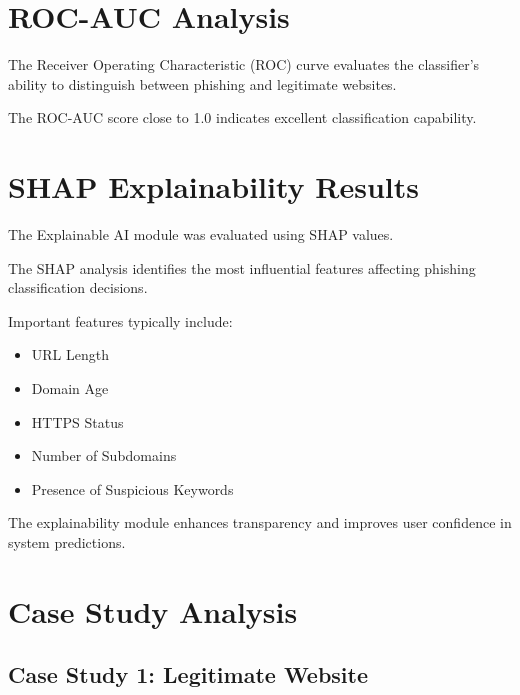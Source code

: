 \documentclass[12pt]{report}
\begin{document}
\section{ROC-AUC Analysis}

The Receiver Operating Characteristic (ROC) curve evaluates the classifier's ability to distinguish between phishing and legitimate websites.


The ROC-AUC score close to 1.0 indicates excellent classification capability.

\section{SHAP Explainability Results}

The Explainable AI module was evaluated using SHAP values.


The SHAP analysis identifies the most influential features affecting phishing classification decisions.

Important features typically include:

\begin{itemize}
    \item URL Length
    \item Domain Age
    \item HTTPS Status
    \item Number of Subdomains
    \item Presence of Suspicious Keywords
\end{itemize}

The explainability module enhances transparency and improves user confidence in system predictions.

\section{Case Study Analysis}

\subsection{Case Study 1: Legitimate Website}
\end{document}
